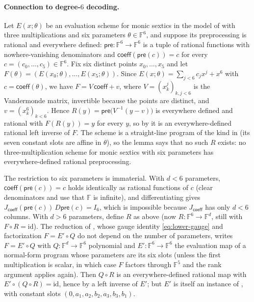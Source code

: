 \paragraph{Connection to degree-$6$ decoding.}
Let $E(x;\theta)$ be an evaluation scheme for monic sextics in the model of  with three multiplications and six parameters $\theta\in\mathbb{F}^6$, and suppose its preprocessing is rational and everywhere defined: $\mathsf{pre}\colon\mathbb{F}^6\to\mathbb{F}^6$ is a tuple of rational functions with nowhere-vanishing denominators and $\mathsf{coeff}(\mathsf{pre}(c))=c$ for every $c=(c_0,\dots,c_5)\in\mathbb{F}^6$.
Fix six distinct points $x_0,\dots,x_5$ and let $F(\theta)=(E(x_0;\theta),\dots,E(x_5;\theta))$.
Since $E(x;\theta)=\sum_{j<6}c_jx^j+x^6$ with $c=\mathsf{coeff}(\theta)$, we have $F=V\,\mathsf{coeff}+v$, where $V=(x_k^j)_{k,j<6}$ is the Vandermonde matrix, invertible because the points are distinct, and $v=(x_k^6)_{k<6}$.
Hence $R(y)=\mathsf{pre}\bigl(V^{-1}(y-v)\bigr)$ is everywhere defined and rational with $F(R(y))=y$ for every $y$, so by  it is an everywhere-defined rational left inverse of $F$.
The scheme is a straight-line program of the kind in  (its seven constant slots are affine in $\theta$), so the lemma says that no such $R$ exists: no three-multiplication scheme for monic sextics with six parameters has everywhere-defined rational preprocessing.

The restriction to six parameters is immaterial.
With $d<6$ parameters, $\mathsf{coeff}(\mathsf{pre}(c))=c$ holds identically as rational functions of $c$ (clear denominators and use that $\mathbb{F}$ is infinite), and differentiating gives $J_{\mathsf{coeff}}(\mathsf{pre}(c))\,D\mathsf{pre}(c)=I_6$, which is impossible because $J_{\mathsf{coeff}}$ has only $d<6$ columns.
With $d>6$ parameters, define $R$ as above (now $R\colon\mathbb{F}^6\to\mathbb{F}^d$, still with $F\circ R=\mathrm{id}$).
The reduction of , whose gauge identity \eqref{eq:lower-gauge} and factorization $F=E'\circ Q$ do not depend on the number of parameters, writes $F=E'\circ Q$ with $Q\colon\mathbb{F}^d\to\mathbb{F}^6$ polynomial and $E'\colon\mathbb{F}^6\to\mathbb{F}^6$ the evaluation map of a normal-form program whose parameters are its six slots (unless the first multiplication is scalar, in which case $F$ factors through $\mathbb{F}^5$ and the rank argument applies again).
Then $Q\circ R$ is an everywhere-defined rational map with $E'\circ(Q\circ R)=\mathrm{id}$, hence by  a left inverse of $E'$; but $E'$ is itself an instance of , with constant slots $(0,a_1,a_2,b_2,a_3,b_3,b_1)$.

